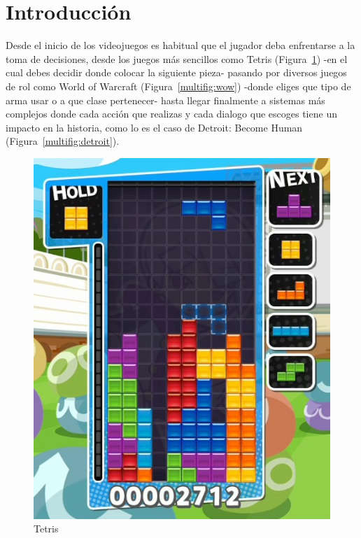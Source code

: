 \section{Introducción}

Desde el inicio de los videojuegos es habitual que el jugador deba enfrentarse a la toma de decisiones, desde los juegos más sencillos como Tetris (Figura~\ref{fig:tetris}) -en el cual debes decidir donde colocar la siguiente pieza- pasando por diversos juegos de rol como World of Warcraft (Figura~\ref{multifig:wow}) -donde eliges que tipo de arma usar o a que clase pertenecer- hasta llegar finalmente a sistemas más complejos donde cada acción que realizas y cada dialogo que escoges tiene un impacto en la historia, como lo es el caso de Detroit: Become Human (Figura~\ref{multifig:detroit}).


\begin{figure}[ht]
    \centering
    \includegraphics[scale=0.4]{imgs/tetris.png}
    \caption{Tetris}
    \label{fig:tetris}
\end{figure}

